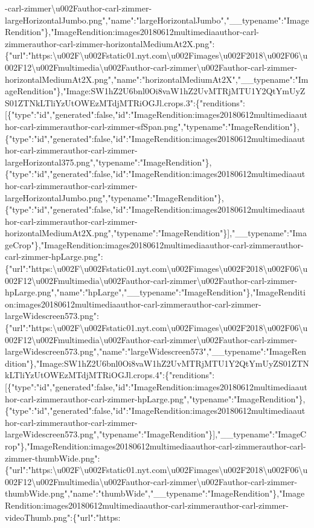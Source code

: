 -carl-zimmer\textbackslash{}u002Fauthor-carl-zimmer-largeHorizontalJumbo.png","name":"largeHorizontalJumbo","\_\_typename":"ImageRendition"\},"ImageRendition:images20180612multimediaauthor-carl-zimmerauthor-carl-zimmer-horizontalMediumAt2X.png":\{"url":"https:\textbackslash{}u002F\textbackslash{}u002Fstatic01.nyt.com\textbackslash{}u002Fimages\textbackslash{}u002F2018\textbackslash{}u002F06\textbackslash{}u002F12\textbackslash{}u002Fmultimedia\textbackslash{}u002Fauthor-carl-zimmer\textbackslash{}u002Fauthor-carl-zimmer-horizontalMediumAt2X.png","name":"horizontalMediumAt2X","\_\_typename":"ImageRendition"\},"Image:SW1hZ2U6bnl0Oi8vaW1hZ2UvMTRjMTU1Y2QtYmUyZS01ZTNkLTliYzUtOWEzMTdjMTRiOGJl.crops.3":\{"renditions":{[}\{"type":"id","generated":false,"id":"ImageRendition:images20180612multimediaauthor-carl-zimmerauthor-carl-zimmer-sfSpan.png","typename":"ImageRendition"\},\{"type":"id","generated":false,"id":"ImageRendition:images20180612multimediaauthor-carl-zimmerauthor-carl-zimmer-largeHorizontal375.png","typename":"ImageRendition"\},\{"type":"id","generated":false,"id":"ImageRendition:images20180612multimediaauthor-carl-zimmerauthor-carl-zimmer-largeHorizontalJumbo.png","typename":"ImageRendition"\},\{"type":"id","generated":false,"id":"ImageRendition:images20180612multimediaauthor-carl-zimmerauthor-carl-zimmer-horizontalMediumAt2X.png","typename":"ImageRendition"\}{]},"\_\_typename":"ImageCrop"\},"ImageRendition:images20180612multimediaauthor-carl-zimmerauthor-carl-zimmer-hpLarge.png":\{"url":"https:\textbackslash{}u002F\textbackslash{}u002Fstatic01.nyt.com\textbackslash{}u002Fimages\textbackslash{}u002F2018\textbackslash{}u002F06\textbackslash{}u002F12\textbackslash{}u002Fmultimedia\textbackslash{}u002Fauthor-carl-zimmer\textbackslash{}u002Fauthor-carl-zimmer-hpLarge.png","name":"hpLarge","\_\_typename":"ImageRendition"\},"ImageRendition:images20180612multimediaauthor-carl-zimmerauthor-carl-zimmer-largeWidescreen573.png":\{"url":"https:\textbackslash{}u002F\textbackslash{}u002Fstatic01.nyt.com\textbackslash{}u002Fimages\textbackslash{}u002F2018\textbackslash{}u002F06\textbackslash{}u002F12\textbackslash{}u002Fmultimedia\textbackslash{}u002Fauthor-carl-zimmer\textbackslash{}u002Fauthor-carl-zimmer-largeWidescreen573.png","name":"largeWidescreen573","\_\_typename":"ImageRendition"\},"Image:SW1hZ2U6bnl0Oi8vaW1hZ2UvMTRjMTU1Y2QtYmUyZS01ZTNkLTliYzUtOWEzMTdjMTRiOGJl.crops.4":\{"renditions":{[}\{"type":"id","generated":false,"id":"ImageRendition:images20180612multimediaauthor-carl-zimmerauthor-carl-zimmer-hpLarge.png","typename":"ImageRendition"\},\{"type":"id","generated":false,"id":"ImageRendition:images20180612multimediaauthor-carl-zimmerauthor-carl-zimmer-largeWidescreen573.png","typename":"ImageRendition"\}{]},"\_\_typename":"ImageCrop"\},"ImageRendition:images20180612multimediaauthor-carl-zimmerauthor-carl-zimmer-thumbWide.png":\{"url":"https:\textbackslash{}u002F\textbackslash{}u002Fstatic01.nyt.com\textbackslash{}u002Fimages\textbackslash{}u002F2018\textbackslash{}u002F06\textbackslash{}u002F12\textbackslash{}u002Fmultimedia\textbackslash{}u002Fauthor-carl-zimmer\textbackslash{}u002Fauthor-carl-zimmer-thumbWide.png","name":"thumbWide","\_\_typename":"ImageRendition"\},"ImageRendition:images20180612multimediaauthor-carl-zimmerauthor-carl-zimmer-videoThumb.png":\{"url":"https:\